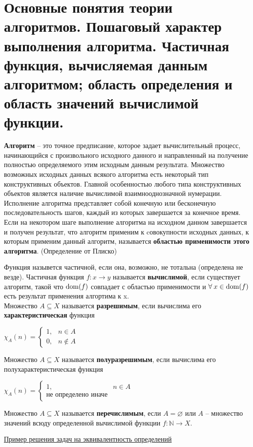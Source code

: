 \section[Основные понятия теории алгоритмов. Пошаговый характер выполнения алгоритма. Частичная функция,
вычисляемая данным алгоритмом]{\sloppy Основные понятия теории алгоритмов. Пошаговый характер выполнения алгоритма.
Частичная функция, вычисляемая данным алгоритмом; область определения и область значений вычислимой функции.}
\begin{definition}
	\textbf{Алгоритм} -- это точное предписание, которое задает вычислительный процесс, начинающийся с
	произвольного исходного данного и направленный на получение полностью определяемого этим исходным данным
	результата. Множество возможных исходных данных всякого алгоритма есть некоторый тип конструктивных объектов.
	Главной особенностью любого типа конструктивных объектов является наличие вычислимой взаимнооднозначной
	нумерации. Исполнение алгоритма представляет собой конечную или бесконечную последовательность шагов, каждый из
	которых завершается за конечное время. Если на некотором шаге выполнение алгоритма на исходном данном
	завершается и получен результат, что алгоритм применим к cовокупности исходных данных, к которым применим
	данный алгоритм, называется \textbf{областью применимости этого алгоритма}. (Определение от Плиско)
\end{definition}
Функция назывется частичной, если она, возможно, не тотальна (определена не везде). Частичная функция $f\colon x\to
y$ называется \textbf{вычислимой}, если существует алгоритм, такой что $\operatorname{dom}(f)$ совпадает с областью
применимости и $\forall \:x\in\operatorname{dom}(f)$ есть результат применения алгортима к x.\\
Множество $A\subseteq X$ называется \textbf{разрешимым}, если вычислима его \textbf{характеристическая} функция
\begin{center}
    $\chi_{A}(n)=\left\{\begin{array}{ll}
    {1,} & {n \in A} \\
    {0,} & {n \notin A}
    \end{array}\right.$
\end{center}
Множество $A\subseteq X$ называется \textbf{полуразрешимым}, если вычислима его полухарактеристическая функция 
    \begin{center}
        $\chi_{A}(n)=\left\{\begin{array}{ll}
        {1,} & {n \in A} \\
        \text{не определено иначе}
        \end{array}\right.$
    \end{center}

Множество $A\subseteq X$ называется \textbf{перечислимым}, если $A=\varnothing$ или $A$ -- множество значений всюду
определенной вычислимой функции $f\colon\mathbb{N}\rightarrow X$.

\href{http://lpcs.math.msu.su/~zolin/vmlta/pdf/2019-2020_Logic_Zolin_Seminar_7_screen.pdf}{\textcolor{mygray}{Пример
решения задач на эквивалентность определений}}
